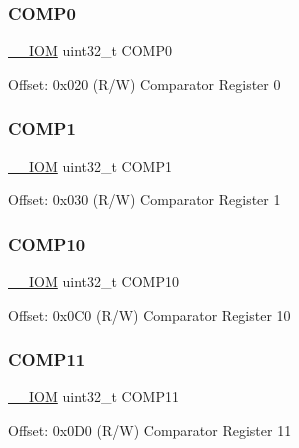 \subsubsection{\texorpdfstring{C\+O\+M\+P0}{COMP0}}
{\footnotesize\ttfamily \mbox{\hyperlink{core__cm4_8h_ab6caba5853a60a17e8e04499b52bf691}{\+\_\+\+\_\+\+I\+OM}} uint32\+\_\+t C\+O\+M\+P0}

Offset\+: 0x020 (R/W) Comparator Register 0 \mbox{\label{struct_d_w_t___type_af9126caaf63b99d6df5d1e040c96e2ab}} 
\subsubsection{\texorpdfstring{C\+O\+M\+P1}{COMP1}}
{\footnotesize\ttfamily \mbox{\hyperlink{core__cm4_8h_ab6caba5853a60a17e8e04499b52bf691}{\+\_\+\+\_\+\+I\+OM}} uint32\+\_\+t C\+O\+M\+P1}

Offset\+: 0x030 (R/W) Comparator Register 1 \mbox{\label{struct_d_w_t___type_a8d5685c2bd0db66c3adaf19bc10a1150}} 
\subsubsection{\texorpdfstring{C\+O\+M\+P10}{COMP10}}
{\footnotesize\ttfamily \mbox{\hyperlink{core__cm4_8h_ab6caba5853a60a17e8e04499b52bf691}{\+\_\+\+\_\+\+I\+OM}} uint32\+\_\+t C\+O\+M\+P10}

Offset\+: 0x0\+C0 (R/W) Comparator Register 10 \mbox{\label{struct_d_w_t___type_ab5e5be1f4cce832413b02bd6eb8175f6}} 
\subsubsection{\texorpdfstring{C\+O\+M\+P11}{COMP11}}
{\footnotesize\ttfamily \mbox{\hyperlink{core__cm4_8h_ab6caba5853a60a17e8e04499b52bf691}{\+\_\+\+\_\+\+I\+OM}} uint32\+\_\+t C\+O\+M\+P11}

Offset\+: 0x0\+D0 (R/W) Comparator Register 11 \mbox{\label{struct_d_w_t___type_a73bbb409205cd8ae8438c8a58998d205}} 
